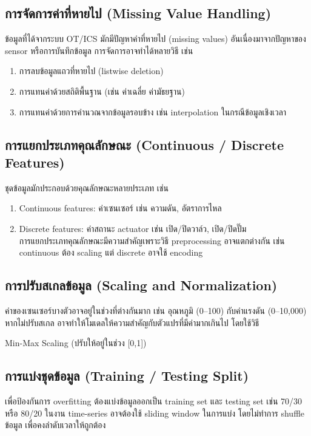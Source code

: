 \subsection{การจัดการค่าที่หายไป (Missing Value Handling)}
\hspace{2em} ข้อมูลที่ได้จากระบบ OT/ICS มักมีปัญหาค่าที่หายไป (missing values) อันเนื่องมาจากปัญหาของ sensor หรือการบันทึกข้อมูล การจัดการอาจทำได้หลายวิธี เช่น
\begin{enumerate}
  \item การลบข้อมูลแถวที่หายไป (listwise deletion)
  \item การแทนค่าด้วยสถิติพื้นฐาน (เช่น ค่าเฉลี่ย ค่ามัธยฐาน)
  \item การแทนค่าด้วยการคำนวณจากข้อมูลรอบข้าง เช่น interpolation ในกรณีข้อมูลเชิงเวลา
\end{enumerate}

\subsection{การแยกประเภทคุณลักษณะ (Continuous / Discrete Features)}
\hspace{2em} ชุดข้อมูลมักประกอบด้วยคุณลักษณะหลายประเภท เช่น
\begin{enumerate}
  \item Continuous features: ค่าเซนเซอร์ เช่น ความดัน, อัตราการไหล
  \item Discrete features: ค่าสถานะ actuator เช่น เปิด/ปิดวาล์ว, เปิด/ปิดปั๊ม \\ การแยกประเภทคุณลักษณะมีความสำคัญเพราะวิธี preprocessing อาจแตกต่างกัน เช่น continuous ต้อง scaling แต่ discrete อาจใช้ encoding
\end{enumerate}

\subsection{การปรับสเกลข้อมูล (Scaling and Normalization)}
\hspace{2em} ค่าของเซนเซอร์บางตัวอาจอยู่ในช่วงที่ต่างกันมาก เช่น อุณหภูมิ (0–100) กับค่าแรงดัน (0–10,000) หากไม่ปรับสเกล อาจทำให้โมเดลให้ความสำคัญกับตัวแปรที่มีค่ามากเกินไป โดยใช้วิธี
\begin{center}
  Min-Max Scaling (ปรับให้อยู่ในช่วง [0,1])
\end{center}

\subsection{การแบ่งชุดข้อมูล (Training / Testing Split)}
\hspace{2em} เพื่อป้องกันการ overfitting ต้องแบ่งข้อมูลออกเป็น training set และ testing set เช่น 70/30 หรือ 80/20 ในงาน time-series อาจต้องใช้ sliding window ในการแบ่ง โดยไม่ทำการ shuffle ข้อมูล เพื่อคงลำดับเวลาให้ถูกต้อง

